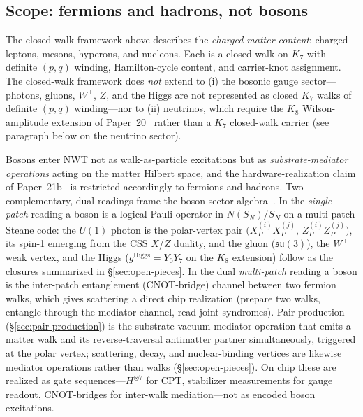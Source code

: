 \documentclass[11pt]{article}
\begin{document}
\subsection{Scope: fermions and hadrons, not bosons}
\label{sec:fermion-hadron-only-scope}

The closed-walk framework above describes the \emph{charged matter content}: charged leptons, mesons, hyperons, and nucleons.  Each is a closed walk on $K_7$ with definite $(p, q)$ winding, Hamilton-cycle content, and carrier-knot assignment.  The closed-walk framework does \emph{not} extend to (i) the bosonic gauge sector---photons, gluons, $W^\pm$, $Z$, and the Higgs are not represented as closed $K_7$ walks of definite $(p, q)$ winding---nor to (ii) neutrinos, which require the $K_8$ Wilson-amplitude extension of Paper~20~\cite{Paper20} rather than a $K_7$ closed-walk carrier (see paragraph below on the neutrino sector).

Bosons enter NWT not as walk-as-particle excitations but as \emph{substrate-mediator operations} acting on the matter Hilbert space, and the hardware-realization claim of Paper~21b~\cite{Paper21b} is restricted accordingly to fermions and hadrons.  Two complementary, dual readings frame the boson-sector algebra~\cite{BosonMemo}.  In the \emph{single-patch} reading a boson is a logical-Pauli operator in $N(S_N)/S_N$ on a multi-patch Steane code: the $U(1)$ photon is the polar-vertex pair $\bigl(X_P^{(i)} X_P^{(j)},\, Z_P^{(i)} Z_P^{(j)}\bigr)$, its spin-1 emerging from the CSS $X$/$Z$ duality, and the gluon ($\mathfrak{su}(3)$), the $W^\pm$ weak vertex, and the Higgs ($g^\text{Higgs} = Y_0 Y_7$ on the $K_8$ extension) follow as the closures summarized in \S\ref{sec:open-pieces}.  In the dual \emph{multi-patch} reading a boson is the inter-patch entanglement (CNOT-bridge) channel between two fermion walks, which gives scattering a direct chip realization (prepare two walks, entangle through the mediator channel, read joint syndromes).  Pair production (\S\ref{sec:pair-production}) is the substrate-vacuum mediator operation that emits a matter walk and its reverse-traversal antimatter partner simultaneously, triggered at the polar vertex; scattering, decay, and nuclear-binding vertices are likewise mediator operations rather than walks (\S\ref{sec:open-pieces}).  On chip these are realized as gate sequences---$H^{\otimes 7}$ for CPT, stabilizer measurements for gauge readout, CNOT-bridges for inter-walk mediation---not as encoded boson excitations.
\end{document}
